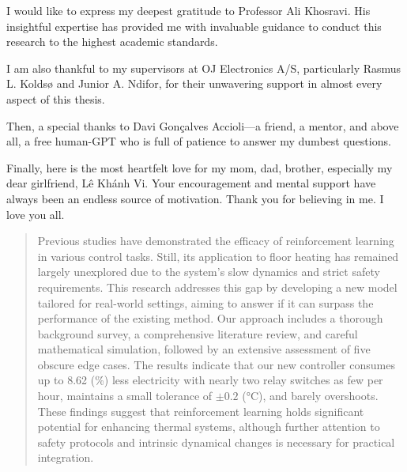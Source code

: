 \begin{acknowledgements}
I would like to express my deepest gratitude to Professor Ali Khosravi. His insightful expertise has provided me with invaluable guidance to conduct this research to the highest academic standards.

I am also thankful to my supervisors at OJ Electronics A/S, particularly Rasmus L. Koldsø and Junior A. Ndifor, for their unwavering support in almost every aspect of this thesis.

Then, a special thanks to Davi Gonçalves Accioli---a friend, a mentor, and above all, a free human-GPT who is full of patience to answer my dumbest questions.
    
Finally, here is the most heartfelt love for my mom, dad, brother, especially my dear girlfriend, Lê Khánh Vi. Your encouragement and mental support have always been an endless source of motivation. Thank you for believing in me. I love you all.
\end{acknowledgements}

\begin{abstract} 
Previous studies have demonstrated the efficacy of reinforcement learning in various control tasks. Still, its application to floor heating has remained largely unexplored due to the system's slow dynamics and strict safety requirements. This research addresses this gap by developing a new model tailored for real-world settings, aiming to answer if it can surpass the performance of the existing method. Our approach includes a thorough background survey, a comprehensive literature review, and careful mathematical simulation, followed by an extensive assessment of five obscure edge cases. The results indicate that our new controller consumes up to 8.62 (\%) less electricity with nearly two relay switches as few per hour, maintains a small tolerance of $\pm 0.2$ (°C), and barely overshoots. These findings suggest that reinforcement learning holds significant potential for enhancing thermal systems, although further attention to safety protocols and intrinsic dynamical changes is necessary for practical integration.
\end{abstract}


\tableofcontents
\listoffigures
\listoftables
\printnomenclature

\mainmatter